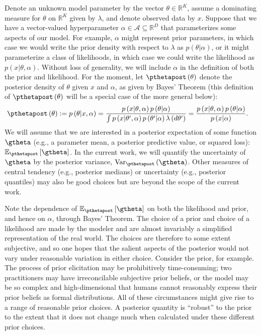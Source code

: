 \documentclass{article}\usepackage[]{graphicx}\usepackage[]{color}
\theoremstyle{definition}
\theoremstyle{plain}
\theoremstyle{plain}
\theoremstyle{plain}
\theoremstyle{definition}
\theoremstyle{plain}
\theoremstyle{plain}
\begin{document}
Denote an unknown model parameter by the vector $\theta\in\mathbb{R}^{K}$,
assume a dominating measure for $\theta$ on $\mathbb{R}^{K}$ given by $\lambda$, and denote
observed data by $x$. Suppose that we have a vector-valued hyperparameter
$\alpha\in\mathcal{A}\subseteq\mathbb{R}^{D}$ that parameterizes some
aspects of our model.  For example, $\alpha$ might represent prior parameters,
in which case we would write the prior density with respect to $\lambda$ as $p\left(\theta\vert\alpha\right)$,
or it might parameterize a class of likelihoods, in which case we could write
the likelihood as $p\left(x\vert\theta,\alpha\right)$.
Without loss of generality, we will include $\alpha$ in the definition of
both the prior and likelihood.
For the moment, let $\pthetapost\left(\theta\right)$ denote the
posterior density of $\theta$ given $x$ and $\alpha$, as given by Bayes'
Theorem (this definition of $\pthetapost\left(\theta\right)$
will be a special case of the more general  below):
\begin{align*}
\pthetapost\left(\theta\right) &
    := p\left(\theta\vert x,\alpha\right)=
    \frac{p\left(x\vert\theta,\alpha\right)p\left(\theta\vert\alpha\right)}
    {\int p\left(x\vert\theta',\alpha\right)p\left(\theta'\vert\alpha\right)
    \lambda\left(d\theta'\right)} =
    \frac{p\left(x\vert\theta,\alpha\right)p\left(\theta\vert\alpha\right)}
    {p\left(x\vert\alpha\right)}.
\end{align*}
We will assume that we are interested in a posterior expectation of
some function $\gtheta$ (e.g., a parameter mean, a posterior predictive
value, or squared loss): $\epgtheta$. In the current work, we will
quantify the uncertainty of $\gtheta$ by the posterior variance,
$\var_{\pthetapost}\left(\gtheta\right)$. Other measures of central
tendency (e.g., posterior medians) or uncertainty (e.g., posterior
quantiles) may also be good choices but are beyond the scope of the
current work.

Note the dependence of $\epgtheta$ on both the likelihood and prior, and hence
on $\alpha$, through Bayes' Theorem. The choice of a prior and choice of a
likelihood are made by the modeler and are almost invariably a simplified
representation of the real world. The choices are therefore to some extent
subjective, and so one hopes that the salient aspects of the posterior would not
vary under reasonable variation in either choice. Consider the prior, for
example. The process of prior elicitation may be prohibitively time-consuming;
two practitioners may have irreconcilable subjective prior beliefs, or the model
may be so complex and high-dimensional that humans cannot reasonably express
their prior beliefs as formal distributions. All of these circumstances might
give rise to a range of reasonable prior choices. A posterior quantity is
``robust'' to the prior to the extent that it does not change much when
calculated under these different prior choices.
\end{document}
